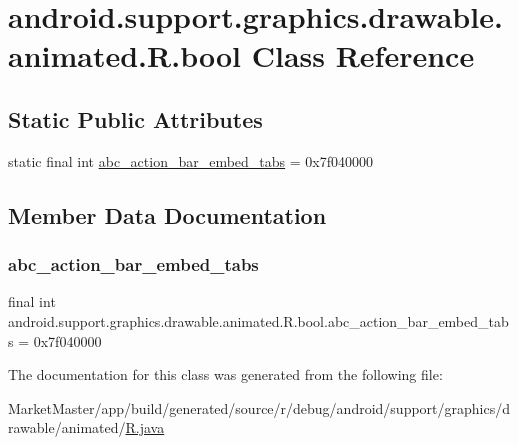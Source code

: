 \hypertarget{classandroid_1_1support_1_1graphics_1_1drawable_1_1animated_1_1R_1_1bool}{}\section{android.\+support.\+graphics.\+drawable.\+animated.\+R.\+bool Class Reference}
\label{classandroid_1_1support_1_1graphics_1_1drawable_1_1animated_1_1R_1_1bool}
\subsection*{Static Public Attributes}
\begin{DoxyCompactItemize}
\item 
static final int \mbox{\hyperlink{classandroid_1_1support_1_1graphics_1_1drawable_1_1animated_1_1R_1_1bool_aa72a93d23c6382aab7e3917f72025bc7}{abc\+\_\+action\+\_\+bar\+\_\+embed\+\_\+tabs}} = 0x7f040000
\end{DoxyCompactItemize}


\subsection{Member Data Documentation}
\mbox{\label{classandroid_1_1support_1_1graphics_1_1drawable_1_1animated_1_1R_1_1bool_aa72a93d23c6382aab7e3917f72025bc7}} 
\subsubsection{\texorpdfstring{abc\+\_\+action\+\_\+bar\+\_\+embed\+\_\+tabs}{abc\_action\_bar\_embed\_tabs}}
{\footnotesize\ttfamily final int android.\+support.\+graphics.\+drawable.\+animated.\+R.\+bool.\+abc\+\_\+action\+\_\+bar\+\_\+embed\+\_\+tabs = 0x7f040000\hspace{0.3cm}{\ttfamily [static]}}



The documentation for this class was generated from the following file\+:\begin{DoxyCompactItemize}
\item 
Market\+Master/app/build/generated/source/r/debug/android/support/graphics/drawable/animated/\mbox{\hyperlink{debug_2android_2support_2graphics_2drawable_2animated_2R_8java}{R.\+java}}\end{DoxyCompactItemize}
